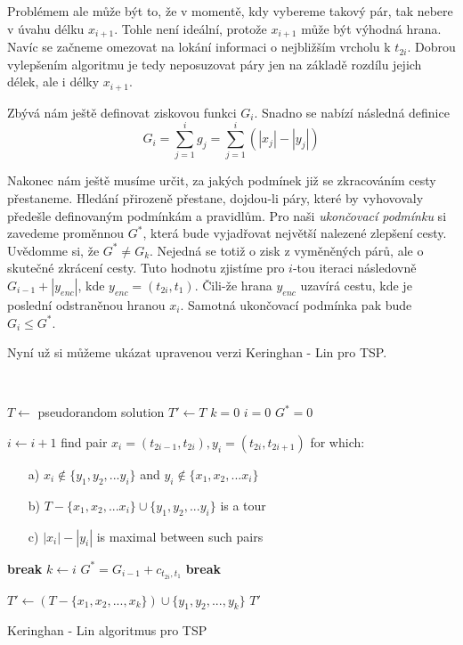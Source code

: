 \documentclass[
  biblatex,
  figures=false,
  glossaries,
  index
]{kidiplom}
\begin{document}
\hspace{6.5mm}Problémem ale může být to, že v momentě, kdy vybereme takový pár, tak nebere v úvahu délku $x_{i+1}$. Tohle není ideální, protože $x_{i+1}$ může být výhodná hrana. Navíc se začneme omezovat na lokání informaci o nejbližším vrcholu k $t_{2i}$. Dobrou vylepšením algoritmu je tedy neposuzovat páry jen na základě rozdílu jejich délek, ale i délky $x_{i+1}$.

\hspace{6.5mm}Zbývá nám ještě definovat ziskovou funkci $G_i$. Snadno se nabízí následná definice
$$G_i = \sum_{j=1}^{i}g_j = \sum_{j=1}^{i}{(|x_j| - |y_j|)}$$

\hspace{6.5mm}Nakonec nám ještě musíme určit, za jakých podmínek již se zkracováním cesty přestaneme. Hledání přirozeně přestane, dojdou-li páry, které by vyhovovaly předešle definovaným podmínkám a pravidlům. Pro naši \textit{ukončovací podmínku} si zavedeme proměnnou $G^*$, která bude vyjadřovat největší nalezené zlepšení cesty. Uvědomme si, že $G^* \ne G_k$. Nejedná se totiž o zisk z vyměněných párů, ale o skutečné zkrácení cesty. Tuto hodnotu zjistíme pro $i$-tou iteraci následovně $G_{i-1} + |y_{enc}|$, kde $y_{enc}= (t_{2i}, t_1)$. Čili-že hrana $y_{enc}$ uzavírá cestu, kde je poslední odstraněnou hranou $x_i$. Samotná ukončovací podmínka pak bude $G_i \le G^*$.

\hspace{6.5mm}Nyní už si můžeme ukázat upravenou verzi Keringhan - Lin pro TSP.
\newline

{\LinesNumbered\SetAlgoNoLine\
\begin{algorithm}[H]
%
$T \leftarrow$ pseudorandom solution\;
$T' \leftarrow T$\;
$k = 0$\;
$i = 0$\;
$G^* = 0$ \;
{
$i \leftarrow i + 1$\;
find pair $x_{i} = (t_{2i-1}, t_{2i}), y_i = (t_{2i}, t_{2i+1})$ for which:
{\begin{itemize}
\item[a)] $x_{i} \notin \{y_1, y_2,... y_i\}$ and  $y_i \notin \{x_1, x_2,... x_i\}$ 
\item[b)] $T - \{x_1, x_2,... x_i\} \cup \{y_1, y_2,... y_i\}$ is a tour
\item[c)] $|x_{i}| - |y_i|$ is maximal between such pairs
\end{itemize}}
	{\textbf{break}\;}
	{$k \leftarrow i$\;
	 $G^* = G_{i-1} + c_{t_{2i},t_1}$\;}
	{\textbf{break}\;}
}
$T' \leftarrow (T - \{x_1, x_2, ..., x_k\}) \cup \{y_1, y_2, ..., y_k\}$\;
\Return $T'$\;
\caption{Keringhan - Lin algoritmus pro TSP}
\end{algorithm}}\leavevmode\newline
\end{document}
